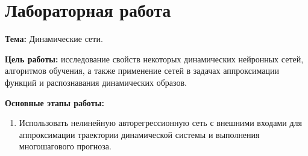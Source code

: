 \section*{Лабораторная работа }

{\bfseries Тема:} Динамические сети.

{\bfseries Цель работы:} исследование свойств некоторых динамических нейронных сетей, алгоритмов обучения, а также применение сетей в задачах аппроксимации функций и распознавания динамических образов.

{\bfseries Основные этапы работы:}
\begin{enumerate}
	\item Использовать нелинейную авторегрессионную сеть с внешними входами для аппроксимации траектории динамической системы и выполнения многошагового прогноза.
\end{enumerate}

\pagebreak
